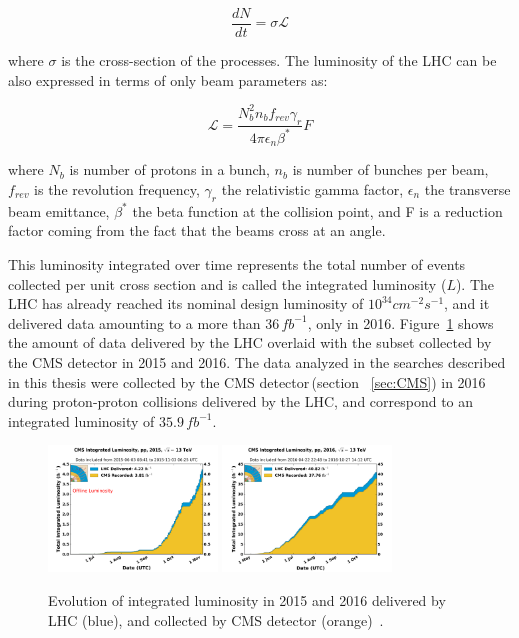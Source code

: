 \begin{equation}
  \frac{dN}{dt}=\sigma\mathscr{L}
\end{equation}


where $\sigma$ is the cross-section of the processes. The luminosity of the LHC can be also expressed in terms of only beam parameters as:

\begin{equation}
  \mathscr{L}=\frac{N_{b}^2 n_{b} f_{rev} \gamma_{r}}{4 \pi \epsilon_{n}\beta^{*}} F
\end{equation}

where $N_{b}$ is number of protons in a bunch, $n_{b}$ is number of bunches per beam, $f_{rev}$ is the revolution frequency, $\gamma_{r}$ the relativistic gamma factor, $\epsilon_{n}$ the transverse beam emittance, $\beta^{*}$ the beta function at the collision point, and F is a reduction factor coming from the fact that the beams cross at an angle.


This luminosity integrated over time represents the total number of events collected per unit cross section and is called the integrated luminosity ($L$). The LHC has already reached its nominal design luminosity of $10^{34} cm^{-2}s^{-1}$, and it delivered data amounting to a more than $36\,fb^{-1}$, only in 2016. Figure~\ref{fig:cms_int_lumi} shows the amount of data delivered by the LHC overlaid with the subset collected by the CMS detector in 2015 and 2016. The data analyzed in the searches described in this thesis were collected by the CMS detector\,(section ~\ref{sec:CMS}) in 2016 during proton-proton collisions delivered by the LHC, and correspond to an integrated luminosity of $35.9\,fb^{-1}$.


\begin{figure}
\begin{center}
  \includegraphics[width=0.4\textwidth,keepaspectratio]{plots_and_figures/chapter3/int_lumi_per_day_cumulative_pp_2015.png}
  \includegraphics[width=0.4\textwidth,keepaspectratio]{plots_and_figures/chapter3/int_lumi_per_day_cumulative_pp_2016.png}
\caption{Evolution of integrated luminosity in 2015 and 2016 delivered by LHC (blue), and collected by CMS detector (orange)~\cite{cms_int_lumi_ref}.}
\label{fig:cms_int_lumi}
\end{center}
\end{figure}

